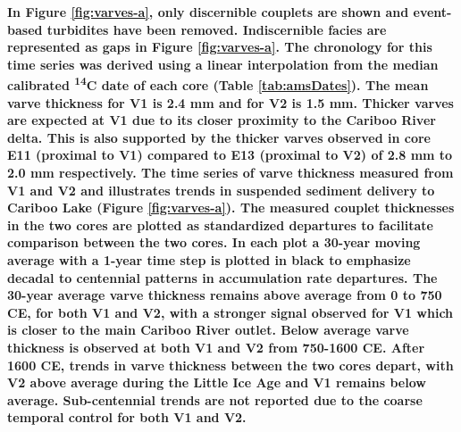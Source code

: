 \documentclass[Royal,times,doublespace,sageh]{sagej}
\begin{document}
\textbf{In Figure \ref{fig:varves-a}, only discernible couplets are
shown and event-based turbidites have been removed. Indiscernible facies
are represented as gaps in Figure \ref{fig:varves-a}. The chronology for
this time series was derived using a linear interpolation from the
median calibrated \textsuperscript{14}C date of each core (Table
\ref{tab:amsDates}). The mean varve thickness for V1 is 2.4 mm and for
V2 is 1.5 mm. Thicker varves are expected at V1 due to its closer
proximity to the Cariboo River delta. This is also supported by the
thicker varves observed in core E11 (proximal to V1) compared to E13
(proximal to V2) of 2.8 mm to 2.0 mm respectively. The time series of
varve thickness measured from V1 and V2 and illustrates trends in
suspended sediment delivery to Cariboo Lake (Figure \ref{fig:varves-a}).
The measured couplet thicknesses in the two cores are plotted as
standardized departures to facilitate comparison between the two cores.
In each plot a 30-year moving average with a 1-year time step is plotted
in black to emphasize decadal to centennial patterns in accumulation
rate departures. The 30-year average varve thickness remains above
average from 0 to 750 CE, for both V1 and V2, with a stronger signal
observed for V1 which is closer to the main Cariboo River outlet. Below
average varve thickness is observed at both V1 and V2 from 750-1600 CE.
After 1600 CE, trends in varve thickness between the two cores depart,
with V2 above average during the Little Ice Age and V1 remains below
average. Sub-centennial trends are not reported due to the coarse
temporal control for both V1 and V2.}
\end{document}
